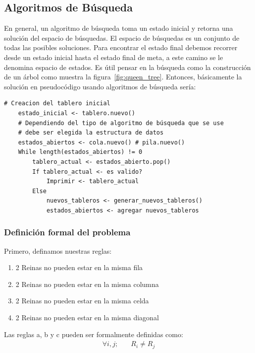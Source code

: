 \documentclass[letter, 10pt]{article}
\begin{document}
\subsection{Algoritmos de Búsqueda}

En general, un algoritmo de búsqueda toma un estado inicial y retorna una solución del espacio de búsquedas. El espacio de búsquedas es un conjunto de todas las posibles soluciones. Para encontrar el estado final debemos recorrer desde un estado inicial hasta el estado final de meta, a este camino se le denomina espacio de estados. Es útil pensar en la búsqueda como la construcción de un árbol como muestra la figura~\ref{fig:queen_tree}. Entonces, básicamente la solución en pseudocódigo usando algoritmos de búsqueda sería: \\

\begin{lstlisting}[frame=single]
    # Creacion del tablero inicial
    estado_inicial <- tablero.nuevo()
    # Dependiendo del tipo de algoritmo de búsqueda que se use
    # debe ser elegida la estructura de datos
    estados_abiertos <- cola.nuevo() # pila.nuevo()
    While length(estados_abiertos) != 0
        tablero_actual <- estados_abierto.pop()
        If tablero_actual <- es valido?
            Imprimir <- tablero_actual
        Else
            nuevos_tableros <- generar_nuevos_tableros()
            estados_abiertos <- agregar nuevos_tableros
\end{lstlisting}

\subsubsection{Definición formal del problema}

Primero, definamos nuestras reglas:
\begin{enumerate}
    \item 2 Reinas no pueden estar en la misma fila
    \item 2 Reinas no pueden estar en la misma columna
    \item 2 Reinas no pueden estar en la misma celda
    \item 2 Reinas no pueden estar en la misma diagonal
\end{enumerate}

Las reglas a, b y c pueden ser formalmente definidas como:
\begin{align*}
    \forall i, j; &\quad R_{i} \neq R_{j}
\end{align*}
\end{document}
